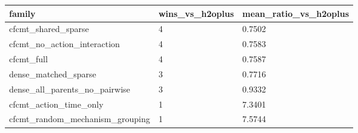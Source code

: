 \begin{tabular}{lll}
\toprule
family & wins\_vs\_h2oplus & mean\_ratio\_vs\_h2oplus \\
\midrule
cfcmt\_shared\_sparse & 4 & 0.7502 \\
cfcmt\_no\_action\_interaction & 4 & 0.7583 \\
cfcmt\_full & 4 & 0.7587 \\
dense\_matched\_sparse & 3 & 0.7716 \\
dense\_all\_parents\_no\_pairwise & 3 & 0.9332 \\
cfcmt\_action\_time\_only & 1 & 7.3401 \\
cfcmt\_random\_mechanism\_grouping & 1 & 7.5744 \\
\bottomrule
\end{tabular}
